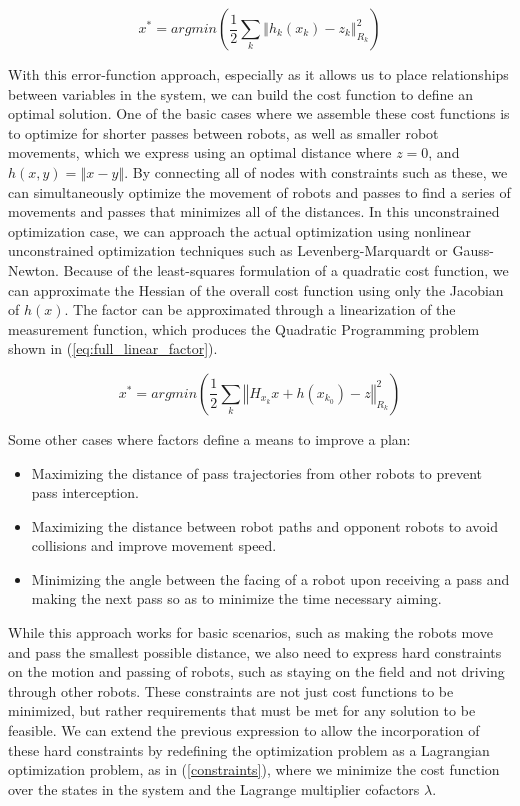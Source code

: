 \begin{equation} \label{factors}
 x^{*} = argmin(\frac{1}{2}\sum_{k}\left\Vert h_{k}(x_{k})-z_{k}\right\Vert _{R_{k}}^{2})
\end{equation} 

With this error-function approach, especially as it allows us to place relationships between variables in the system, we can build the cost function to define an optimal solution.  One of the basic cases where we assemble these cost functions is to optimize for shorter passes between robots, as well as smaller robot movements, which we express using an optimal distance where $z=0$, and $h(x,y)=\left\Vert x-y \right\Vert$.  By connecting all of nodes with constraints such as these, we can simultaneously optimize the movement of robots and passes to find a series of movements and passes that minimizes all of the distances.  In this unconstrained optimization case, we can approach the actual optimization using nonlinear unconstrained optimization techniques such as Levenberg-Marquardt or Gauss-Newton. Because of the least-squares formulation of a quadratic cost function, we can approximate the Hessian of the overall cost function using only the Jacobian of $h(x)$.  The factor can be approximated through a linearization of the measurement function, which produces the Quadratic Programming problem shown in (\ref{eq:full_linear_factor}).  

\begin{equation} \label{eq:full_linear_factor}
x^{*} = argmin(\frac{1}{2}\sum_{k}\left\Vert H_{x_{k}}x+h(x_{k_{0}})-z\right\Vert _{R_{k}}^{2})
\end{equation}

Some other cases where factors define a means to improve a plan:
\begin{itemize}
 \item Maximizing the distance of pass trajectories from other robots to prevent pass interception.
 \item Maximizing the distance between robot paths and opponent robots to avoid collisions and improve movement speed.
 \item Minimizing the angle between the facing of a robot upon receiving a pass and making the next pass so as to minimize the time necessary aiming.  
\end{itemize}

While this approach works for basic scenarios, such as making the robots move and pass the smallest possible distance, we also need to express hard constraints on the motion and passing of robots, such as staying on the field and not driving through other robots.  These constraints are not just cost functions to be minimized, but rather requirements that must be met for any solution to be feasible.  We can extend the previous expression to allow the incorporation of these hard constraints by redefining the optimization problem as a Lagrangian optimization problem, as in (\ref{constraints}), where we minimize the cost function over the states in the system and the Lagrange multiplier cofactors $\lambda$.

